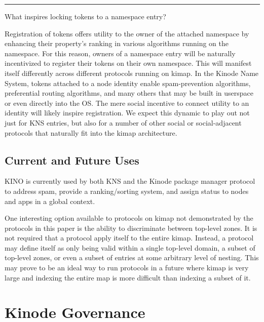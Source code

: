 \documentclass[runningheads]{llncs}
\begin{document}
\begin{center}
\noindent\rule{8cm}{0.4pt}
\end{center}

What inspires locking tokens to a namespace entry?

Registration of tokens offers utility to the owner of the attached namespace by enhancing their property's ranking in various algorithms running on the namespace.
For this reason, owners of a namespace entry will be naturally incentivized to register their tokens on their own namespace.
This will manifest itself differently across different protocols running on kimap.
In the Kinode Name System, tokens attached to a node identity enable spam-prevention algorithms, preferential routing algorithms, and many others that may be built in userspace or even directly into the OS.
The mere social incentive to connect utility to an identity will likely inspire registration.
We expect this dynamic to play out not just for KNS entries, but also for a number of other social or social-adjacent protocols that naturally fit into the kimap architecture.

\subsection{Current and Future Uses}
\label{sec:kinouses}

KINO is currently used by both KNS and the Kinode package manager protocol to address spam, provide a ranking/sorting system, and assign status to nodes and apps in a global context.

One interesting option available to protocols on kimap not demonstrated by the protocols in this paper is the ability to discriminate between top-level zones.
It is not required that a protocol apply itself to the entire kimap.
Instead, a protocol may define itself as only being valid within a single top-level domain, a subset of top-level zones, or even a subset of entries at some arbitrary level of nesting.
This may prove to be an ideal way to run protocols in a future where kimap is very large and indexing the entire map is more difficult than indexing a subset of it.

\section{Kinode Governance}
\label{sec:governance}
\end{document}

